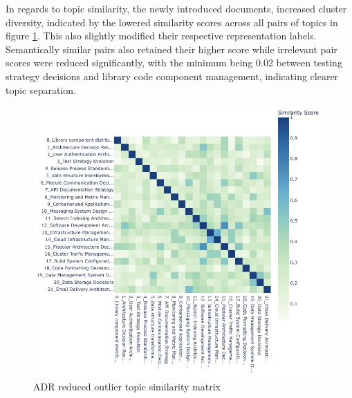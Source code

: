         In regards to topic similarity, the newly introduced documents, increased cluster diversity, indicated by the lowered similarity scores across all pairs of topics in figure \ref{fig:similarity_matrix_reduced}. This also slightly modified their respective representation labels. Semantically similar pairs also retained their higher score while irrelevant pair scores were reduced significantly, with the minimum being 0.02 between testing strategy decisions and library code component management,  indicating clearer topic separation. 

        \begin{figure}[h]
            \centering
            \hspace*{-2cm} 
            \includegraphics[scale=0.55]{figures/No Titles/similarity_matrix_reduced_outliers_no_title.jpeg}
            \caption{ADR reduced outlier topic similarity matrix}
            \label{fig:similarity_matrix_reduced}
        \end{figure}

